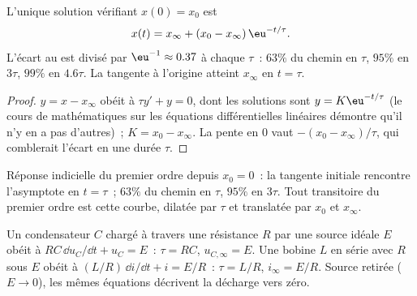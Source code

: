 \begin{theorem}[Solution]\label{thm:b1:transient-regimes:firstorder}
L'unique solution vérifiant $x(0) = x_0$ est
\[
x(t) = x_\infty + (x_0 - x_\infty)\,\eu^{-t/\tau} .
\]
L'écart au  est divisé par $\eu^{-1} \approx
0.37$ à chaque $\tau$~: $63\%$ du chemin en $\tau$, $95\%$ en $3\tau$,
$99\%$ en $4.6\tau$. La tangente à l'origine atteint $x_\infty$ en
$t = \tau$.
\end{theorem}

\begin{proof}
$y = x - x_\infty$ obéit à $\tau y' + y = 0$, dont les solutions sont
$y = K\eu^{-t/\tau}$ (le cours de mathématiques sur les équations
différentielles linéaires démontre qu'il n'y en a pas d'autres)~;
$K = x_0 - x_\infty$. La pente en $0$ vaut $-(x_0 - x_\infty)/\tau$, qui
comblerait l'écart en une durée $\tau$.
\end{proof}

\begin{omfigure}

{\small Réponse indicielle du premier ordre depuis $x_0 = 0$~: la
tangente initiale rencontre l'asymptote en $t = \tau$~; $63\%$ du chemin
en $\tau$, $95\%$ en $3\tau$. Tout transitoire du premier ordre est
cette courbe, dilatée par $\tau$ et translatée par $x_0$ et $x_\infty$.}
\end{omfigure}

\begin{proposition}[Circuits RC et RL]\label{prop:b1:transient-regimes:rcrl}
Un condensateur $C$ chargé à travers une résistance $R$ par une source
idéale $E$ obéit à $RC\,\dd u_C/\dd t + u_C = E$~: $\tau = RC$,
$u_{C,\infty} = E$. Une bobine $L$ en série avec $R$ sous $E$ obéit à $(L/R)\,\dd i/\dd t + i =
E/R$~: $\tau = L/R$, $i_\infty = E/R$. Source retirée
($E \to 0$), les mêmes équations décrivent la décharge vers zéro.
\end{proposition}

